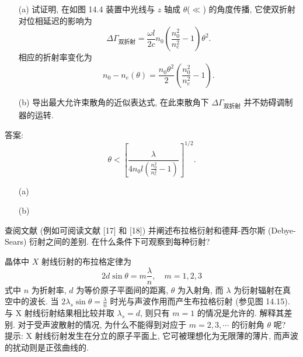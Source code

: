 \documentclass{note}
\begin{document}
\begin{exe}
    \begin{itemize}
        \item[(a)] 试证明, 在如图 14.4 装置中光线与 $z$ 轴成 $\theta$($\ll$) 的角度传播, 它使双折射对位相延迟的影响为
        \[
            \Delta\Gamma_{\text{双折射}}=\frac{\omega l}{2c}n_0\left(\frac{n_0^2}{n_e^2}-1\right)\theta^2.
        \]
        相应的折射率变化为
        \[
            n_0-n_e(\theta)=\frac{n_0\theta^2}{2}\left(\frac{n_0^2}{n_e^2}-1\right).
        \]
        \item[(b)] 导出最大允许束散角的近似表达式, 在此束散角下 $\Delta\Gamma_{\text{双折射}}$ 并不妨碍调制器的运转.
    \end{itemize}
    答案:
    \[
        \theta<\left[\frac{\lambda}{4n_0l\left(\frac{n_0^2}{n_e^2}-1\right)}\right]^{1/2}.
    \]
\end{exe}
\begin{sol}
    \begin{itemize}
        \item[(a)] 
        \item[(b)] 
    \end{itemize}
\end{sol}

\begin{exe}
    查阅文献 (例如可阅读文献 [17] 和 [18]) 并阐述布拉格衍射和德拜-西尔斯 (Debye-Sears) 衍射之间的差别. 在什么条件下可观察到每种衍射?
\end{exe}
\begin{sol}
    
\end{sol}

\begin{exe}
    晶体中 $X$ 射线衍射的布拉格定律为
    \[
        2d\sin\theta=m\frac{\lambda}{n},\quad m=1,2,3
    \]
    式中 $n$ 为折射率, $d$ 为等价原子平面间的距离, $\theta$ 为入射角, 而 $\lambda$ 为衍射辐射在真空中的波长. 当 $2\lambda_s\sin\theta=\frac{\lambda}{n}$ 时光与声波作用而产生布拉格衍射 (参见图 14.15). 与 X 射线衍射结果相比较并取 $\lambda_s=d$, 则只有 $m=1$ 的情况是允许的. 解释其差别. 对于受声波散射的情况, 为什么不能得到对应于 $m=2,3,\cdots$ 的衍射角 $\theta$ 呢?\\
    提示: X 射线衍射发生在分立的原子平面上, 它可被理想化为无限薄的薄片, 而声波的扰动则是正弦曲线的.
\end{exe}
\begin{sol}
    
\end{sol}
\end{document}
